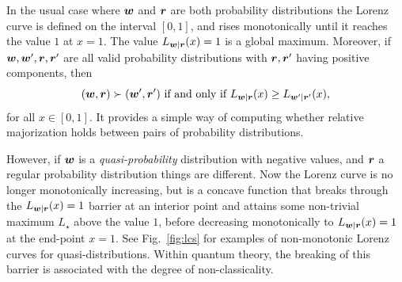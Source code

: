\documentclass[pra,
aps,
twocolumn,
superscriptaddress,
groupedaddress,
nofootinbib,
reprint
]{revtex4-1}
\begin{document}
In the usual case where $\boldsymbol{w}$ and $\boldsymbol{r}$ are both probability distributions the Lorenz curve is defined on the interval $[0,1]$, and rises monotonically until it reaches the value $1$ at $x=1$. The value $L_{\boldsymbol{w}|\boldsymbol{r}}(x) = 1$ is a global maximum. Moreover, if $\boldsymbol{w}, \boldsymbol{w}', \boldsymbol{r}, \boldsymbol{r}'$ are all valid probability distributions with $\boldsymbol{r},\boldsymbol{r}'$ having positive components, then
\begin{equation*}
(\boldsymbol{w}, \boldsymbol{r}) \succ (\boldsymbol{w}', \boldsymbol{r}') \mbox{ if and only if } L_{\boldsymbol{w} |\boldsymbol{r}}(x) \ge L_{\boldsymbol{w}' |\boldsymbol{r}'}(x),
\end{equation*}
for all $x \in [0,1]$. 
It provides a simple way of computing whether relative majorization holds between pairs of probability distributions.

However, if $\boldsymbol{w}$ is a \emph{quasi-probability} distribution with negative values, and $\boldsymbol{r}$ a regular probability distribution things are different. Now the Lorenz curve is no longer monotonically increasing, but is a concave function that breaks through the $L_{\boldsymbol{w}|\boldsymbol{r}}(x) = 1$ barrier at an interior point and attains some non-trivial maximum $L_\star$ above the value $1$, before decreasing monotonically to $L_{\boldsymbol{w}|\boldsymbol{r}}(x)= 1$ at the end-point $x=1$. See Fig.~\ref{fig:lcs} for examples of non-monotonic Lorenz curves for quasi-distributions. Within quantum theory, the breaking of this barrier is associated with the degree of non-classicality.
\end{document}
